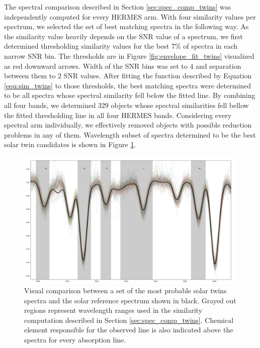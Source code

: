 The spectral comparison described in Section \ref{sec:spec_comp_twins} was independently computed for every HERMES arm. With four similarity values per spectrum, we selected the set of best matching spectra in the following way. As the similarity value heavily depends on the SNR value of a spectrum, we first determined thresholding similarity values for the best 7\% of spectra in each narrow SNR bin. The thresholds are in Figure \ref{fig:envelope_fit_twins} visualized as red downward arrows. Width of the SNR bins was set to $4$ and separation between them to $2$ SNR values. After fitting the function described by Equation \ref{equ:sim_twins} to those thresholds, the best matching spectra were determined to be all spectra whose spectral similarity fell below the fitted line. By combining all four bands, we determined $329$ objects whose spectral similarities fell bellow the fitted thresholding line in all four HERMES bands. Considering every spectral arm individually, we effectively removed objects with possible reduction problems in any of them. Wavelength subset of spectra determined to be the best solar twin candidates is shown in Figure \ref{fig:selection_step1_twins}.

\begin{figure}
	\centering
	\includegraphics[width=\textwidth]{selection_step1.png}
	\caption{Visual comparison between a set of the most probable solar twins spectra and the solar reference spectrum shown in black. Grayed out regions represent wavelength ranges used in the similarity computation described in Section \ref{sec:spec_comp_twins}. Chemical element responsible for the observed line is also indicated above the spectra for every absorption line.}
	\label{fig:selection_step1_twins}
\end{figure}

